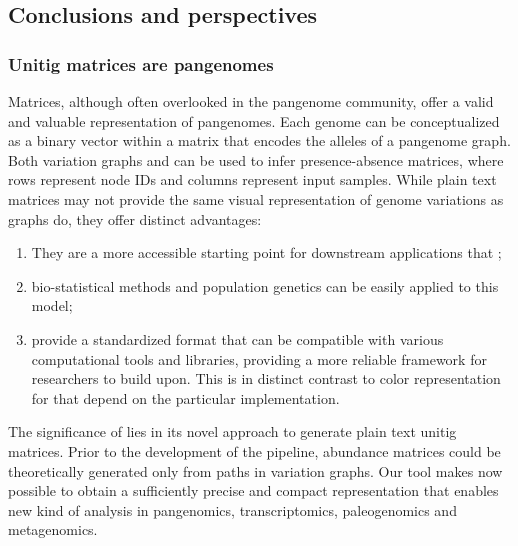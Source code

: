\subsection{Conclusions and perspectives}
\subsubsection{Unitig matrices are pangenomes}
Matrices, although often overlooked in the pangenome community, offer a valid and valuable representation of pangenomes. Each genome can be conceptualized as a binary vector within a matrix that encodes the alleles of a pangenome graph. Both variation graphs and \ccdbgs can be used to infer presence-absence matrices, where rows represent node IDs and columns represent input samples. 
While plain text matrices may not provide the same visual representation of genome variations as graphs do, they offer distinct advantages:
\begin{enumerate}
	\item They are a more accessible starting point for downstream applications that \dbgs;
	\item bio-statistical methods and population genetics can be easily applied to this model;
	\item provide a standardized format that can be compatible with various computational tools and libraries, providing a more reliable framework for researchers to build upon. This is in distinct contrast to color representation for \ccdbgs that depend on the particular implementation.
\end{enumerate} 
The significance of \muset lies in its novel approach to generate plain text unitig matrices. Prior to the development of the \muset pipeline, abundance matrices could be theoretically generated only from paths in variation graphs. Our tool makes now possible to obtain a sufficiently precise and compact representation that enables new kind of analysis in pangenomics, transcriptomics, paleogenomics and metagenomics.\\

